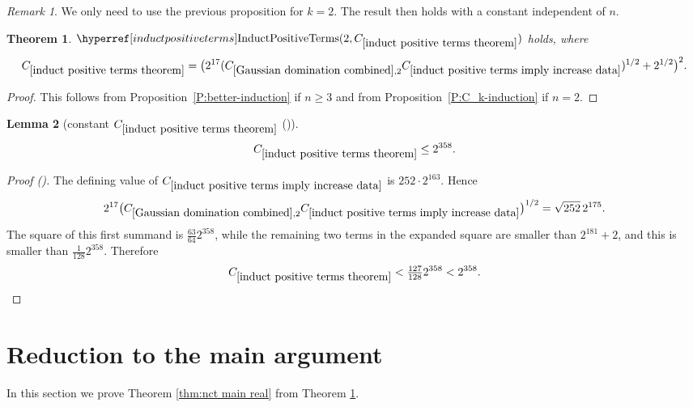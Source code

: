 \documentclass[12pt,reqno]{amsart}
\newcommand{\auto}{{({\tiny\faCar})}}
\theoremstyle{plain}
\newtheorem{theorem}{Theorem}[section]
\newtheorem{lemma}[theorem]{Lemma}
\numberwithin{equation}{section}
\theoremstyle{remark}
\newtheorem{rem}{Remark}[section]
\newcommand{\using}[1]{}
\begin{document}
\begin{rem}
We only need to use the previous proposition for $k=2$. The result then holds with a constant independent of $n$.
\end{rem}

\begin{theorem}\label{induct positive terms theorem}\using{P:better-induction}\using{P:C_k-induction}
$\InductPositiveTerms{2,C_{\ref{induct positive terms theorem}}}$ holds, where
\begin{equation}\label{auto:positive-induction-constant-definition}
C_{\ref{induct positive terms theorem}}
=
\bigl(2^{17}(C_{\ref{Gaussian domination combined},2}C_{\ref{induct positive terms imply increase data}})^{1/2}+2^{1/2}\bigr)^2.
\end{equation}
\end{theorem}

\begin{proof}
This follows from Proposition~\ref{P:better-induction} if $n\ge 3$ and from Proposition~\ref{P:C_k-induction} if $n=2$.
\end{proof}

\begin{lemma}[constant $C_{\ref{induct positive terms theorem}}$ \auto]\label{constant induct positive terms theorem}\using{induct positive terms imply increase data}\using{Gaussian domination combined}\using{induct positive terms theorem}
\begin{equation}\label{constant induct positive terms theorem bound}
C_{\ref{induct positive terms theorem}}\le2^{358}.
\end{equation}
\end{lemma}
\begin{proof}[Proof \auto]
The defining value of $C_{\ref{induct positive terms imply increase data}}$ is $252\cdot2^{163}$. Hence
\[
2^{17}\bigl(C_{\ref{Gaussian domination combined},2}C_{\ref{induct positive terms imply increase data}}\bigr)^{1/2}
=\sqrt{252}\,2^{175}.
\]
The square of this first summand is $\tfrac{63}{64}2^{358}$, while the remaining two terms in the expanded square are smaller than $2^{181}+2$, and this is smaller than $\tfrac1{128}2^{358}$. Therefore
\[
C_{\ref{induct positive terms theorem}}
<\tfrac{127}{128}2^{358}<2^{358}.
\]
\end{proof}


\section{Reduction to the main argument}\label{sec:reduction}
In this section we prove Theorem \ref{thm:nct main real} from Theorem \ref{induct positive terms theorem}.
\end{document}
